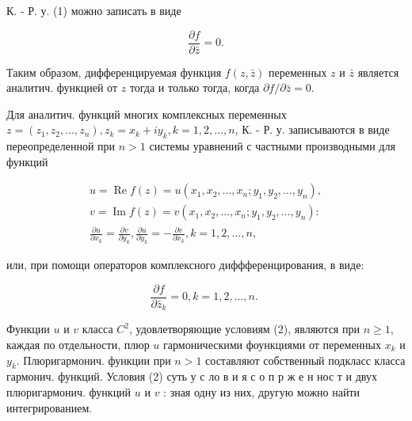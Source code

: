 \documentclass[10pt]{article}
\begin{document}
К. - Р. у. (1) можно записать в виде



\[

\frac{\partial f}{\partial \bar{z}}=0 .

\]



Таким образом, дифференцируемая функция $f(z, \bar{z})$ переменных $z$ и $\bar{z}$ является аналитич. функцией от $z$ тогда и только тогда, когда $\partial f / \partial \bar{z}=0$.



Для аналитич. функций многих комплексных переменных $z=\left(z_{1}, z_{2}, \ldots, z_{n}\right), z_{k}=x_{k}+i y_{k}, k=1,2, \ldots, n$, К. - Р. у. записываются в виде переопределенной при $n>1$ системы уравнений с частными производными для функций



\[

\begin{gathered}

u=\operatorname{Re} f(z)=u\left(x_{1}, x_{2}, \ldots, x_{n} ; y_{1}, y_{2}, \ldots, y_{n}\right), \\

v=\operatorname{Im} f(z)=v\left(x_{1}, x_{2}, \ldots, x_{n} ; y_{1}, y_{2}, \ldots, y_{n}\right): \\

\frac{\partial u}{\partial x_{k}}=\frac{\partial v}{\partial y_{k}}, \frac{\partial u}{\partial y_{k}}=-\frac{\partial v}{\partial x_{k}}, k=1,2, \ldots, n,

\end{gathered}

\]



или, при помощи операторов комплексного диффференцирования, в виде:



\[

\frac{\partial f}{\partial \bar{z}_{k}}=0, k=1,2, \ldots, n \text {. }

\]



Функции $u$ и $v$ класса $C^{2}$, удовлетворяющие условиям (2), являются при $n \geqslant 1$, каждая по отдельности, плюр $u$ гармоническими фоункциями от переменных $x_{k}$ и $y_{k}$. Плюригармонич. функции при $n>1$ составляют собственный подкласс класса гармонич. функций. Условия (2) суть у с ло в и я с о п р ж е н нос т и двух плюригармонич. функций $u$ и $v$ : зная одну из них, другую можно найти интегрированием.
\end{document}
